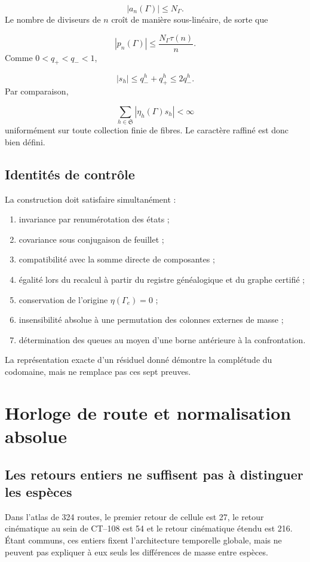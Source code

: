 \[
 |a_n(\Gamma)|\le N_\Gamma.
\]
Le nombre de diviseurs de \(n\) croît de manière sous-linéaire, de sorte que

\[
 |p_n(\Gamma)|
 \le\frac{N_\Gamma\tau(n)}n.
\]
Comme \(0<q_+<q_-<1\),

\[
 |s_h|\le q_-^h+q_+^h\le2q_-^h.
\]
Par comparaison,

\[
 \sum_{h\in\mathfrak S}|\eta_h(\Gamma)s_h|<\infty
\]
uniformément sur toute collection finie de fibres. Le caractère raffiné est donc bien défini.

\subsection{Identités de contrôle}
La construction doit satisfaire simultanément :

\begin{enumerate}
\item invariance par renumérotation des états ;
\item covariance sous conjugaison de feuillet ;
\item compatibilité avec la somme directe de composantes ;
\item égalité lors du recalcul à partir du registre généalogique et du graphe certifié ;
\item conservation de l’origine \(\eta(\Gamma_e)=0\) ;
\item insensibilité absolue à une permutation des colonnes externes de masse ;
\item détermination des queues au moyen d’une borne antérieure à la confrontation.
\end{enumerate}
La représentation exacte d’un résiduel donné démontre la complétude du codomaine, mais ne remplace pas ces sept preuves.

\section{Horloge de route et normalisation absolue}
\subsection{Les retours entiers ne suffisent pas à distinguer les espèces}
Dans l’atlas de 324 routes, le premier retour de cellule est 27, le retour cinématique au sein de CT--108 est 54 et le retour cinématique étendu est 216. Étant communs, ces entiers fixent l’architecture temporelle globale, mais ne peuvent pas expliquer à eux seuls les différences de masse entre espèces.

